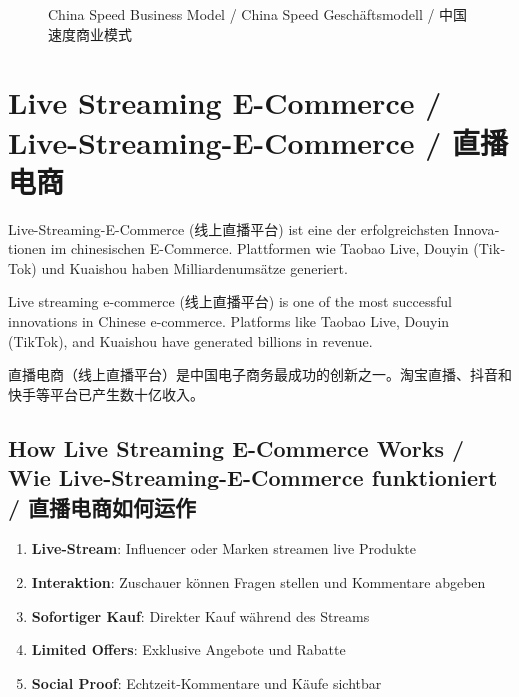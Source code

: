 \begin{figure}[h]
\caption{China Speed Business Model / China Speed Geschäftsmodell / 中国速度商业模式}
\end{figure}

\section{Live Streaming E-Commerce / Live-Streaming-E-Commerce / 直播电商}

\begin{otherlanguage}{ngerman}
Live-Streaming-E-Commerce (线上直播平台) ist eine der erfolgreichsten Innovationen im chinesischen E-Commerce. Plattformen wie Taobao Live, Douyin (TikTok) und Kuaishou haben Milliardenumsätze generiert.
\end{otherlanguage}

Live streaming e-commerce (线上直播平台) is one of the most successful innovations in Chinese e-commerce. Platforms like Taobao Live, Douyin (TikTok), and Kuaishou have generated billions in revenue.

直播电商（线上直播平台）是中国电子商务最成功的创新之一。淘宝直播、抖音和快手等平台已产生数十亿收入。

\subsection{How Live Streaming E-Commerce Works / Wie Live-Streaming-E-Commerce funktioniert / 直播电商如何运作}

\begin{otherlanguage}{ngerman}
\begin{enumerate}
    \item \textbf{Live-Stream}: Influencer oder Marken streamen live Produkte
    \item \textbf{Interaktion}: Zuschauer können Fragen stellen und Kommentare abgeben
    \item \textbf{Sofortiger Kauf}: Direkter Kauf während des Streams
    \item \textbf{Limited Offers}: Exklusive Angebote und Rabatte
    \item \textbf{Social Proof}: Echtzeit-Kommentare und Käufe sichtbar
\end{enumerate}
\end{otherlanguage}

